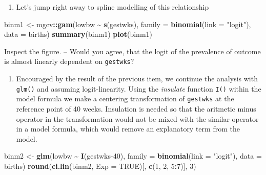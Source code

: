 \documentclass[
]{book}
\newenvironment{Shaded}{\begin{snugshade}}{\end{snugshade}}
\newcommand{\AttributeTok}[1]{\textcolor[rgb]{0.13,0.29,0.53}{#1}}
\newcommand{\ConstantTok}[1]{\textcolor[rgb]{0.56,0.35,0.01}{#1}}
\newcommand{\DecValTok}[1]{\textcolor[rgb]{0.00,0.00,0.81}{#1}}
\newcommand{\FunctionTok}[1]{\textcolor[rgb]{0.13,0.29,0.53}{\textbf{#1}}}
\newcommand{\NormalTok}[1]{#1}
\newcommand{\OtherTok}[1]{\textcolor[rgb]{0.56,0.35,0.01}{#1}}
\newcommand{\SpecialCharTok}[1]{\textcolor[rgb]{0.81,0.36,0.00}{\textbf{#1}}}
\newcommand{\StringTok}[1]{\textcolor[rgb]{0.31,0.60,0.02}{#1}}
\providecommand{\tightlist}{%
  \setlength{\itemsep}{0pt}\setlength{\parskip}{0pt}}
\begin{document}
\begin{enumerate}
\def\labelenumi{\arabic{enumi}.}
\setcounter{enumi}{3}
\tightlist
\item
  Let's jump right away to spline modelling of this relationship
\end{enumerate}

\begin{Shaded}
\begin{Highlighting}[]
\NormalTok{binm1 }\OtherTok{\textless{}{-}}\NormalTok{ mgcv}\SpecialCharTok{::}\FunctionTok{gam}\NormalTok{(lowbw }\SpecialCharTok{\textasciitilde{}} \FunctionTok{s}\NormalTok{(gestwks), }\AttributeTok{family =} \FunctionTok{binomial}\NormalTok{(}\AttributeTok{link =} \StringTok{"logit"}\NormalTok{), }\AttributeTok{data =}\NormalTok{ births)}
\FunctionTok{summary}\NormalTok{(binm1)}
\FunctionTok{plot}\NormalTok{(binm1)}
\end{Highlighting}
\end{Shaded}

Inspect the figure. -- Would you agree, that the logit of the prevalence
of outcome is almost linearly dependent on \texttt{gestwks}?

\begin{enumerate}
\def\labelenumi{\arabic{enumi}.}
\setcounter{enumi}{4}
\tightlist
\item
  Encouraged by the result of the previous item, we continue
  the analysis with \texttt{glm()} and assuming logit-linearity. Using
  the \emph{insulate} function \texttt{I()} within the model formula
  we make a centering transformation
  of \texttt{gestwks} at the reference point of 40 weeks.
  Insulation is needed so that the aritmetic minus operator
  in the transformation would not be mixed with the similar
  operator in a model formula, which would remove an explanatory
  term from the model.
\end{enumerate}

\begin{Shaded}
\begin{Highlighting}[]
\NormalTok{binm2 }\OtherTok{\textless{}{-}} \FunctionTok{glm}\NormalTok{(lowbw }\SpecialCharTok{\textasciitilde{}} \FunctionTok{I}\NormalTok{(gestwks}\DecValTok{{-}40}\NormalTok{), }\AttributeTok{family =} \FunctionTok{binomial}\NormalTok{(}\AttributeTok{link =} \StringTok{"logit"}\NormalTok{), }\AttributeTok{data =}\NormalTok{ births)}
\FunctionTok{round}\NormalTok{(}\FunctionTok{ci.lin}\NormalTok{(binm2, }\AttributeTok{Exp =} \ConstantTok{TRUE}\NormalTok{)[, }\FunctionTok{c}\NormalTok{(}\DecValTok{1}\NormalTok{, }\DecValTok{2}\NormalTok{, }\DecValTok{5}\SpecialCharTok{:}\DecValTok{7}\NormalTok{)], }\DecValTok{3}\NormalTok{)}
\end{Highlighting}
\end{Shaded}
\end{document}
